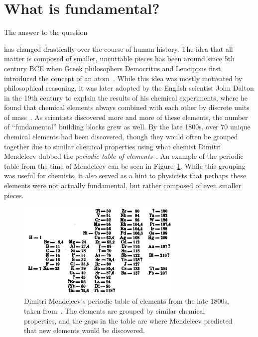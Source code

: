 \section{What is fundamental?}
\label{sec:fundamental}

The answer to the question 
\begin{center}
\end{center}
has changed drastically over the course of human history. The idea that all matter is composed of smaller, uncuttable pieces has been around since 5th century BCE when Greek philosophers Democritus and Leucippus first introduced the concept of an atom~\cite{GreekAtom}. While this idea was mostly motivated by philosophical reasoning, it was later adopted by the English scientist John Dalton in the 19th century to explain the results of his chemical experiments, where he found that chemical elements always combined with each other by discrete units of mass~\cite{Dalton}. As scientists discovered more and more of these elements, the number of ``fundamental'' building blocks grew as well. By the late 1800s, over 70 unique chemical elements had been discovered, though they would often be grouped together due to similar chemical properties using what chemist Dimitri Mendeleev dubbed the \textit{periodic table of elements}~\cite{PeriodicTable}. An example of the periodic table from the time of Mendeleev can be seen in Figure~\ref{fig:periodic_table}. While this grouping was useful for chemists, it also served as a hint to physicists that perhaps these elements were not actually fundamental, but rather composed of even smaller pieces.

\begin{figure}[ht]
    \centering
    \includegraphics[width=0.7\textwidth]{figures/introduction/PeriodicTable.png}
    \caption{Dimitri Mendeleev's periodic table of elements from the late 1800s, taken from~\cite{MendeleevPaper}. The elements are grouped by similar chemical properties, and the gaps in the table are where Mendeleev predicted that new elements would be discovered.}
    \label{fig:periodic_table}
\end{figure}


